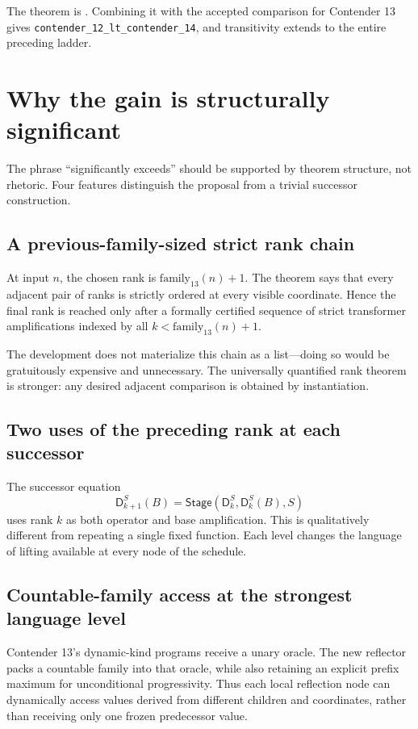 \documentclass[11pt]{article}
\theoremstyle{definition}
\newcommand{\stage}{\mathsf{Stage}}
\newcommand{\diag}{\mathsf{D}}
\newcommand{\code}[1]{\texttt{#1}}
\begin{document}
The theorem is .  Combining it with the accepted comparison for Contender 13 gives \code{contender\_12\_lt\_contender\_14}, and transitivity extends to the entire preceding ladder.

\section{Why the gain is structurally significant}

The phrase ``significantly exceeds'' should be supported by theorem structure, not rhetoric.  Four features distinguish the proposal from a trivial successor construction.

\subsection{A previous-family-sized strict rank chain}

At input $n$, the chosen rank is $\mathrm{family}_{13}(n)+1$.  The theorem  says that every adjacent pair of ranks is strictly ordered at every visible coordinate.  Hence the final rank is reached only after a formally certified sequence of strict transformer amplifications indexed by all $k<\mathrm{family}_{13}(n)+1$.

The development does not materialize this chain as a list---doing so would be gratuitously expensive and unnecessary.  The universally quantified rank theorem is stronger: any desired adjacent comparison is obtained by instantiation.

\subsection{Two uses of the preceding rank at each successor}

The successor equation
\[
 \diag^S_{k+1}(B)
 =\stage(\diag^S_k,\diag^S_k(B),S)
\]
uses rank $k$ as both operator and base amplification.  This is qualitatively different from repeating a single fixed function.  Each level changes the language of lifting available at every node of the schedule.

\subsection{Countable-family access at the strongest language level}

Contender 13's dynamic-kind programs receive a unary oracle.  The new reflector packs a countable family into that oracle, while also retaining an explicit prefix maximum for unconditional progressivity.  Thus each local reflection node can dynamically access values derived from different children and coordinates, rather than receiving only one frozen predecessor value.
\end{document}
